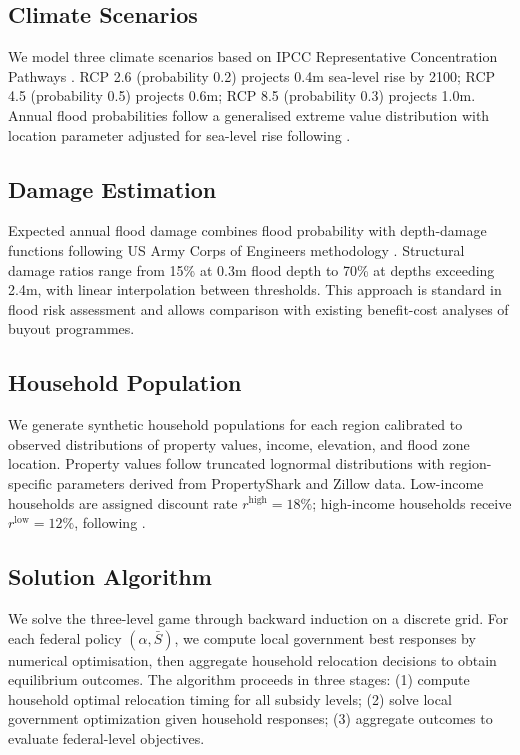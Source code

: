 \documentclass[preprint,12pt,authoryear]{elsarticle}
\begin{document}
\subsection{Climate Scenarios}

We model three climate scenarios based on IPCC Representative Concentration Pathways \citep{ipcc2019srocc}. RCP 2.6 (probability 0.2) projects 0.4m sea-level rise by 2100; RCP 4.5 (probability 0.5) projects 0.6m; RCP 8.5 (probability 0.3) projects 1.0m. Annual flood probabilities follow a generalised extreme value distribution with location parameter adjusted for sea-level rise following \citet{buchanan2016allowances}.

\subsection{Damage Estimation}

Expected annual flood damage combines flood probability with depth-damage functions following US Army Corps of Engineers methodology \citep{usace1992depth}. Structural damage ratios range from 15\% at 0.3m flood depth to 70\% at depths exceeding 2.4m, with linear interpolation between thresholds. This approach is standard in flood risk assessment \citep{wing2018estimates} and allows comparison with existing benefit-cost analyses of buyout programmes.

\subsection{Household Population}

We generate synthetic household populations for each region calibrated to observed distributions of property values, income, elevation, and flood zone location. Property values follow truncated lognormal distributions with region-specific parameters derived from PropertyShark and Zillow data. Low-income households are assigned discount rate $r^{\text{high}} = 18\%$; high-income households receive $r^{\text{low}} = 12\%$, following \citet{warner2001personal}.

\subsection{Solution Algorithm}

We solve the three-level game through backward induction on a discrete grid. For each federal policy $(\alpha, \bar{S})$, we compute local government best responses by numerical optimisation, then aggregate household relocation decisions to obtain equilibrium outcomes. The algorithm proceeds in three stages: (1) compute household optimal relocation timing for all subsidy levels; (2) solve local government optimization given household responses; (3) aggregate outcomes to evaluate federal-level objectives.
\end{document}
